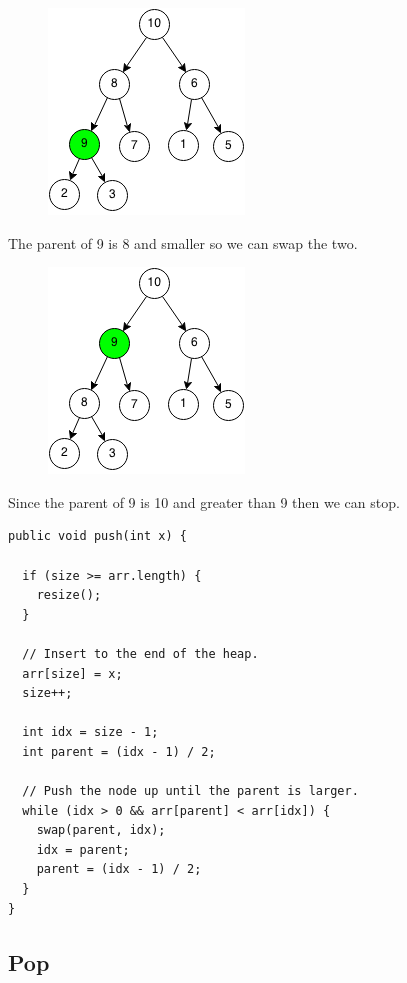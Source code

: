 \documentclass[11pt,oneside]{book}
\makeatletter
\def\maxwidth#1{\ifdim\Gin@nat@width>#1 #1\else\Gin@nat@width\fi}
\makeatother
\begin{document}
\vspace{5px}\begin{figure}[H]\centering
        \includegraphics[width=0.66\maxwidth{\textwidth}]{maxheappush2.png}
        \end{figure}

The parent of 9 is 8 and smaller so we can swap the two.

\vspace{5px}\begin{figure}[H]\centering
        \includegraphics[width=0.66\maxwidth{\textwidth}]{maxheappush3.png}
        \end{figure}

Since the parent of 9 is 10 and greater than 9 then we can stop.

\begin{lstlisting}
public void push(int x) {

  if (size >= arr.length) {
    resize();
  }

  // Insert to the end of the heap.
  arr[size] = x;
  size++;

  int idx = size - 1;
  int parent = (idx - 1) / 2;

  // Push the node up until the parent is larger.
  while (idx > 0 && arr[parent] < arr[idx]) {
    swap(parent, idx);
    idx = parent;
    parent = (idx - 1) / 2;
  }
}
\end{lstlisting}

\subsection{Pop}
\end{document}
